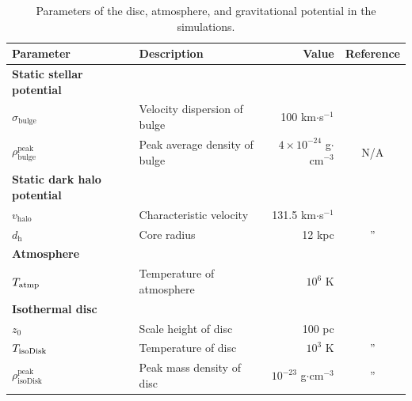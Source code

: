 \documentclass[fleqn,usenatbib,useAMS]{mnras}
\begin{document}
\begin{table}
\raggedright
\caption{Parameters of the disc, atmosphere, and gravitational potential in the simulations.}
\label{table-parameters}
\begin{tabular}{@{}llrc@{}}
\toprule[1pt]\midrule[0.3pt]
Parameter                             & Description                    & Value                                &  Reference                     \\ \midrule
{\bf Static stellar potential }       &                                &                                      &                                \\
$\sigma_{\text{bulge}}$               & Velocity dispersion of bulge   & 100 km$\cdot$s$^{-1}$                & \citep{velocity-dispersion-MW} \\
$\rho_{\text{bulge}}^{\text{peak}}$   & Peak average density of bulge  & $4\times 10^{-24}$ g$\cdot$cm$^{-3}$ &   N/A                          \\ \hline
{\bf Static dark halo potential }     &                                &                                      &                                \\
$v_{\text{halo}}$                     & Characteristic velocity        & 131.5 km$\cdot$s$^{-1}$              & \citep{Johnston1995}           \\
$d_{\text{h}}$                        & Core radius                    & 12 kpc                               & \multicolumn{1}{c}{''}         \\ \hline
{\bf Atmosphere }                     &                                &                                      &                                \\
$T_{\text{\text{atmp}}}$              & Temperature of atmosphere      & $10^{6}$ K                           & \citep{temperature-MW}         \\ \hline
{\bf Isothermal disc }                &                                &                                      &                                \\
$z_{0}$                               & Scale height of disc           & 100 pc                               & \citep{peak-ism-density}       \\
$T_{\text{\text{isoDisk}}}$           & Temperature of disc            & $10^{3}$ K                           & \multicolumn{1}{c}{''}         \\
$\rho_{\text{isoDisk}}^{\text{peak}}$ & Peak mass density of disc      & $10^{-23}$ g$\cdot$cm$^{-3}$         & \multicolumn{1}{c}{''}         \\ \hline

\end{tabular}
\end{table}
\end{document}
